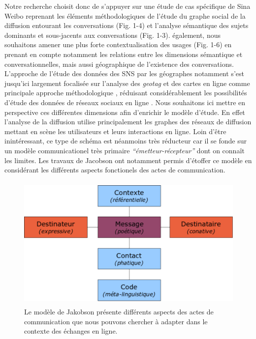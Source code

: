 Notre recherche choisit donc de s{\textquoteright}appuyer sur une étude de cas spécifique de Sina Weibo reprenant les éléments méthodologiques de l{\textquoteright}étude du graphe social de la diffusion entourant les conversations (Fig. 1-4) et l{\textquoteright}analyse sémantique des sujets dominants et sous-jacents aux conversations (Fig. 1-3). également, nous souhaitons amener une plus forte contextualisation des usages (Fig. 1-6) en prenant en compte notamment les relations entre les dimensions sémantique et conversationnelles, mais aussi géographique de l{\textquoteright}existence des conversations. L{\textquoteright}approche de l{\textquoteright}étude des données des SNS par les géographes notamment s{\textquoteright}est jusqu{\textquoteright}ici largement focalisée sur l{\textquoteright}analyse des \textit{geotag} et des cartes en ligne comme principale approche méthodologique \citep{Graham2011, Poorthuis2013}, réduisant considérablement les possibilités d{\textquoteright}étude des données de réseaux sociaux en ligne \citep{Crampton2013}. Nous souhaitons ici mettre en perspective ces différentes dimensions afin d{\textquoteright}enrichir le modèle d{\textquoteright}étude. En effet l{\textquoteright}analyse de la diffusion utilise principalement les graphes des réseaux de diffusion mettant en scène les utilisateurs et leurs interactions en ligne. Loin d{\textquoteright}\^etre inintéressant, ce type de schéma est néanmoins très réducteur car il se fonde sur un modèle communicationel très primaire \textit{{\textquotedblleft}émetteur-récepteur{\textquotedblright} }dont on conna\^it les limites. Les travaux de Jacobson ont notamment permis d{\textquoteright}étoffer ce modèle en considérant les différents aspects fonctionels des actes de communication.


\begin{figure}
    \centering

    \includegraphics[width=4.6894in,height=2.6114in]{figures/chap3/chapitre3-img5.png}

    \caption[Modèle de Jakobson]{ Le modèle de Jakobson présente différents aspects des actes de communication que nous pouvons chercher à adapter dans le contexte des échanges en ligne.}

\end{figure}

